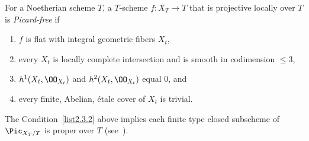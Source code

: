 \begin{defi}\cite[Definition~2.10]{Zhu} \label{defn-Zhu}
For a Noetherian scheme $T$, a $T$-scheme $f:X_T\to T$ that is projective locally over $T$ is \emph{Picard-free} if
\begin{enumerate}\romanenumi
\item \label{list2.3.1}$f$ is flat with integral geometric fibers $X_t$,
\item \label{list2.3.2}every $X_t$ is locally complete intersection and is smooth in codimension $\leq 3$,
\item \label{list2.3.3}$h^1(X_t,\OO_{X_t})$ and $h^2(X_t,\OO_{X_t})$ equal $0$, and
\item \label{list2.3.4}every finite, Abelian, étale cover of $X_t$ is trivial.
\end{enumerate}
\end{defi}

The Condition~\eqref{list2.3.2} above implies each finite type closed subscheme of $\Pic_{X_T/T}$ is proper over $T$ (see~\cite[XI, 3.13]{SGA2N}).

